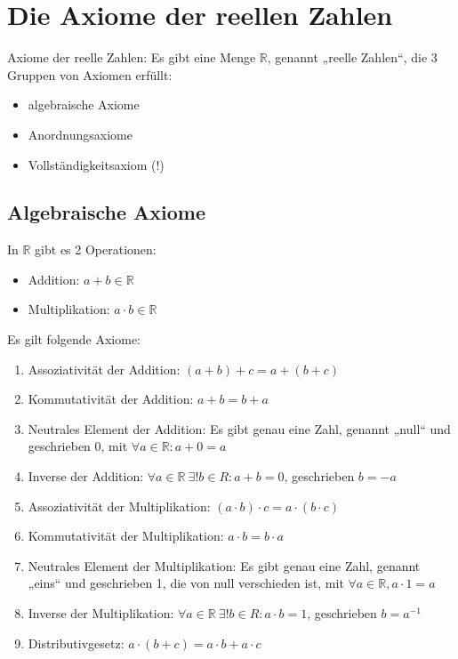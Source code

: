 \chapter{Die Axiome der reellen Zahlen}
Axiome der reelle Zahlen: Es gibt eine Menge $\mathbb{R}$, genannt „reelle Zahlen“, die 3 Gruppen von Axiomen erfüllt:
\begin{itemize}
\item algebraische Axiome
\item Anordnungsaxiome
\item Vollständigkeitsaxiom (!)
\end{itemize}

\section{Algebraische Axiome}
In $\mathbb{R}$ gibt es 2 Operationen:
\begin{itemize}
\item Addition: $a+b \in \mathbb{R}$
\item Multiplikation: $a \cdot b \in \mathbb{R}$
\end{itemize}

Es gilt folgende Axiome:
\begin{enumerate}
\item Assoziativität der Addition: $(a + b) + c = a + (b + c)$
\item Kommutativität der Addition: $a + b = b + a$
\item Neutrales Element der Addition: Es gibt genau eine Zahl, genannt „null“ und geschrieben 0, mit $\forall a \in \mathbb{R}: a + 0 = a$
\item Inverse der Addition: $\forall a \in \mathbb{R}\: \exists! b \in R: a + b = 0$, geschrieben $b = -a$
\item Assoziativität der Multiplikation: $(a \cdot b) \cdot c = a \cdot (b \cdot c)$
\item Kommutativität der Multiplikation: $a \cdot b = b \cdot a$
\item Neutrales Element der Multiplikation: Es gibt genau eine Zahl, genannt „eins“ und geschrieben 1, die von null verschieden ist, mit $\forall a \in \mathbb{R}, a \cdot 1 = a$
\item Inverse der Multiplikation: $\forall a \in \mathbb{R}\: \exists! b \in R: a \cdot b = 1$, geschrieben $b = a^{-1}$
\item Distributivgesetz: $a \cdot (b + c) = a \cdot b + a \cdot c$
\end{enumerate}

